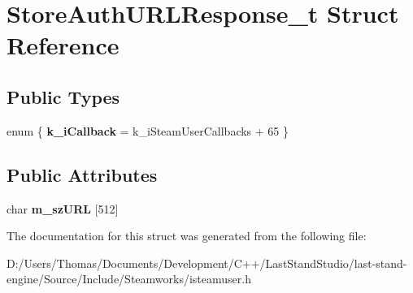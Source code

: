 \hypertarget{structStoreAuthURLResponse__t}{}\section{Store\+Auth\+U\+R\+L\+Response\+\_\+t Struct Reference}
\label{structStoreAuthURLResponse__t}
\subsection*{Public Types}
\begin{DoxyCompactItemize}
\item 
\hypertarget{structStoreAuthURLResponse__t_ac4c15e6f4560e987243f03b59c9934c2}{}enum \{ {\bfseries k\+\_\+i\+Callback} = k\+\_\+i\+Steam\+User\+Callbacks + 65
 \}\label{structStoreAuthURLResponse__t_ac4c15e6f4560e987243f03b59c9934c2}

\end{DoxyCompactItemize}
\subsection*{Public Attributes}
\begin{DoxyCompactItemize}
\item 
\hypertarget{structStoreAuthURLResponse__t_a8c9864ac521a1f7e815b2fa90d5a1745}{}char {\bfseries m\+\_\+sz\+U\+R\+L} \mbox{[}512\mbox{]}\label{structStoreAuthURLResponse__t_a8c9864ac521a1f7e815b2fa90d5a1745}

\end{DoxyCompactItemize}


The documentation for this struct was generated from the following file\+:\begin{DoxyCompactItemize}
\item 
D\+:/\+Users/\+Thomas/\+Documents/\+Development/\+C++/\+Last\+Stand\+Studio/last-\/stand-\/engine/\+Source/\+Include/\+Steamworks/isteamuser.\+h\end{DoxyCompactItemize}
